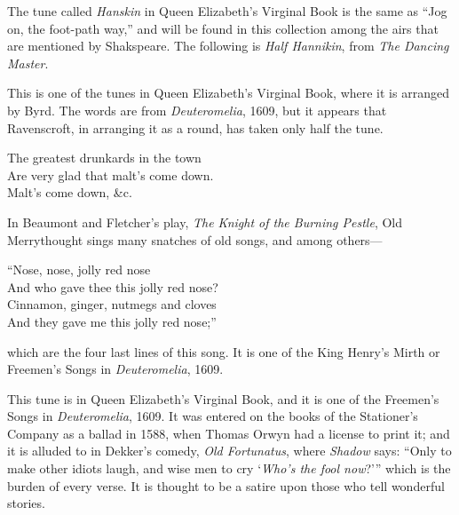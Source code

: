 The tune called \textit{Hanskin} in Queen \pagebreak 
Elizabeth’s Virginal Book is the same as
“Jog on, the foot-path way,” and will be found in this collection among the airs
that are mentioned by Shakspeare. The following is \textit{Half Hannikin}, from \textit{The
Dancing Master}.



This is one of the tunes in Queen Elizabeth’s Virginal Book, where it is
arranged by Byrd. The words are from \textit{Deuteromelia}, 1609, but it appears that
Ravenscroft, in arranging it as a round, has taken only half the tune.


\settowidth{\versewidth}{The greatest drunkards in the town}
\begin{scverse}
\begin{patverse}
The greatest drunkards in the town\\
Are very glad that malt’s come down.\\
Malt’s come down, \&c.
\end{patverse}
\end{scverse}
\pagebreak


In Beaumont and Fletcher’s play, \textit{The Knight of the Burning Pestle}, Old
Merrythought sings many snatches of old songs, and among others—

\begin{scverse}
“Nose, nose, jolly red nose\\
And who gave thee this jolly red nose? \\
Cinnamon, ginger, nutmegs and cloves\\
And they gave me this jolly red nose;”
\end{scverse}

\noindent which are the four last lines of this song. It is one of the King Henry’s Mirth
or Freemen’s Songs in \textit{Deuteromelia}, 1609.


\pagebreak



This tune is in Queen Elizabeth’s Virginal Book, and it is one of the Freemen’s
Songs in \textit{Deuteromelia}, 1609. It was entered on the books of the Stationer’s
Company as a ballad in 1588, when Thomas Orwyn had a license to print it; and
it is alluded to in Dekker’s comedy, \textit{Old Fortunatus}, where \textit{Shadow} says: “Only
to make other idiots laugh, and wise men to cry ‘\textit{Who's the fool now}?’” which
is the burden of every verse. It is thought to be a satire upon those who tell
wonderful stories.

